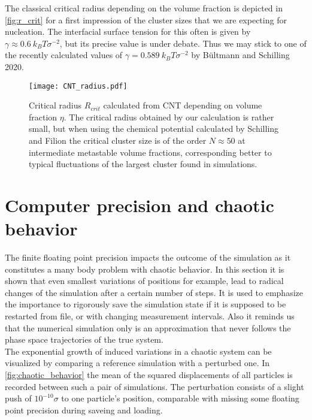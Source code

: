 The classical critical radius depending on the volume fraction is depicted in \autoref{fig:r_crit} for a first impression of the cluster sizes that we are expecting for nucleation. The interfacial surface tension for this often is given by $\gamma \approx \SI{0.6}{k_B T \sigma^{-2}}$, but its precise value is under debate. Thus we may stick to one of the recently calculated values of $\gamma = \SI{0.589}{k_B T \sigma^{-2}}$ by Bültmann and Schilling 2020\cite{Bultmann2020}. 
\begin{figure}[h]
\centering
\texttt{[image: CNT\_radius.pdf]}
\caption[Critical radius in the metastable regime]{Critical radius $R_{crit}$ calculated from CNT depending on volume fraction $\eta$. The critical radius obtained by our calculation is rather small, but when using the chemical potential calculated by Schilling and Filion the critical cluster size is of the order $N \approx 50$ at intermediate metastable volume fractions, corresponding better to typical fluctuations of the largest cluster found in simulations.}
\label{fig:r_crit}
\end{figure}

\section{Computer precision and chaotic behavior}
\label{sec:precision}
The finite floating point precision impacts the outcome of the simulation as it constitutes a many body problem with chaotic behavior. In this section it is shown that even smallest variations of positions for example, lead to radical changes of the simulation after a certain number of steps. It is used to emphasize the importance to rigorously save the simulation state if it is supposed to be restarted from file, or with changing measurement intervals. Also it reminds us that the numerical simulation only is an approximation that never follows the phase space trajectories of the true system.\\

The exponential growth of induced variations in a chaotic system can be visualized by comparing a reference simulation with a perturbed one. In \autoref{fig:chaotic_behavior} the mean of the squared displacements of all particles is recorded between such a pair of simulations. The perturbation consists of a slight push of $10^{-10} \sigma$ to one particle's position, comparable with missing some floating point precision during saveing and loading.\\

